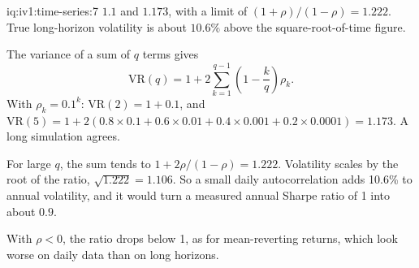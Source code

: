 \begin{solution}{iq:iv1:time-series:7}
$1.1$ and $1.173$, with a limit of $(1 + \rho)/(1 - \rho) = 1.222$. True long-horizon volatility is about $10.6\%$ above the square-root-of-time figure.

The variance of a sum of $q$ terms gives
\[
\mathrm{VR}(q) = 1 + 2\sum_{k = 1}^{q - 1}\left(1 - \frac{k}{q}\right)\rho_k.
\]
With $\rho_k = 0.1^k$: $\mathrm{VR}(2) = 1 + 0.1$, and $\mathrm{VR}(5) = 1 + 2(0.8 \times 0.1 + 0.6 \times 0.01 + 0.4 \times 0.001 + 0.2 \times 0.0001) = 1.173$. A long simulation agrees.

For large $q$, the sum tends to $1 + 2\rho/(1 - \rho) = 1.222$. Volatility scales by the root of the ratio, $\sqrt{1.222} = 1.106$. So a small daily autocorrelation adds 10.6\% to annual volatility, and it would turn a measured annual Sharpe ratio of 1 into about $0.9$.

With $\rho < 0$, the ratio drops below 1, as for mean-reverting returns, which look worse on daily data than on long horizons.



\end{solution}


